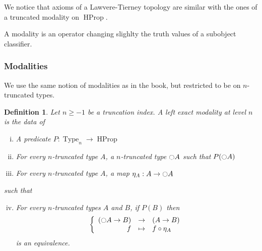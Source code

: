 \documentclass{beamer}
\newtheorem{defi}[thm]{Definition}
\DeclareMathOperator{\Type}{Type}
\DeclareMathOperator{\HProp}{HProp}
\newcommand{\modal}{\ensuremath{\ocircle}}
\begin{document}
\begin{frame}
  We notice that axioms of a Lawvere-Tierney topology are similar with
  the ones of a truncated modality on $\HProp$.

  \bigskip

  A modality is an operator changing slighlty the truth values of a
  subobject classifier.

\end{frame}

\begin{frame}
  \note{ }
  \frametitle{Modalities}
  We use the same notion of modalities as in the book, but restricted to be on $n$-truncated types.
\begin{defi}
  \label{sec:defin-basic-prop-1}
  Let $n\geq -1$ be a truncation index. A left exact modality at level
  $n$ is the data of
  \begin{enumerate}[(i)]
  \item A predicate $P:\Type_n \to \HProp$
  \item For every $n$-truncated type $A$, a $n$-truncated type
    $\modal A$ such that $P(\modal A)$
  \item For every $n$-truncated type $A$, a map $\eta_A:A \to
    \modal A$
  \end{enumerate}
  such that
  \begin{enumerate}[(i)]
    \setcounter{enumi}{3}
  \item For every $n$-truncated types $A$ and $B$, if $P(B)$ then
    $$\left\{
      \begin{array}{rcl}
        (\modal A \to B) & \to & (A \to B) \\
        f & \mapsto & f \circ \eta_A
      \end{array} \right.$$
    is an equivalence.
  \end{enumerate}
\end{defi}
\end{frame}
\end{document}
